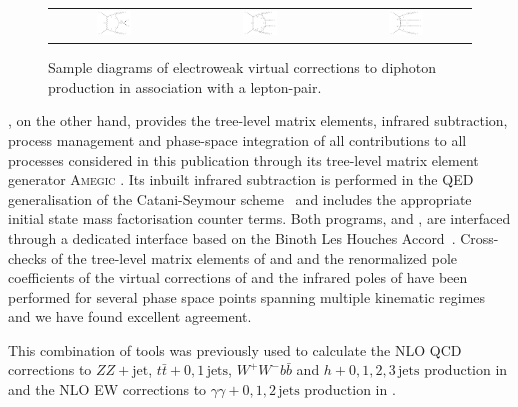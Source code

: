 \begin{figure}[t!]
  \begin{tabular}{ccccc}
    \includegraphics[width=0.288\textwidth]{diagrams/aaZ_V_2} & &
    \includegraphics[width=0.288\textwidth]{diagrams/aaZ_V_1} & &
    \includegraphics[width=0.288\textwidth]{diagrams/aaZ_V_3} \\
  \end{tabular}
  \caption{
    Sample diagrams of electroweak virtual corrections to diphoton 
    production in association with a lepton-pair.
    \label{fig:aaz:amps}
  }
\end{figure}

\Sherpa, on the other hand, provides the tree-level matrix 
elements, infrared subtraction, process management and phase-space 
integration of all contributions to all processes considered in 
this publication through its tree-level matrix element generator 
\textsc{Amegic} \cite{Krauss:2001iv}. 
Its inbuilt infrared subtraction is performed in the QED 
generalisation of the Catani-Seymour scheme~\cite{Catani:1996vz,
  Dittmaier:1999mb,Gleisberg:2007md,Kallweit:2014xda,
  Kallweit:2015dum,Kallweit:2017khh,Schonherr:2017xxx}
and includes the appropriate initial state mass factorisation 
counter terms.
Both programs, \Sherpa and \GoSam, are interfaced through a 
dedicated interface based on the 
Binoth Les Houches Accord~\cite{Binoth:2010xt,Alioli:2013nda}. 
Cross-checks of the tree-level matrix elements of \GoSam and 
\Sherpa and the renormalized pole coefficients of the virtual 
corrections of \GoSam and the infrared poles of \Sherpa have 
been performed for several phase space points spanning 
multiple kinematic regimes and we have found excellent 
agreement.

This combination of tools was previously used to calculate the 
NLO QCD corrections to $ZZ+\text{jet}$, $t\bar{t}+0,1\,\text{jets}$, 
$W^{+}W^{-}b\bar{b}$ and $h+0,1,2,3\,\text{jets}$ production 
in \cite{Binoth:2009wk,Hoeche:2013mua,Heinrich:2013qaa,
  Greiner:2015jha,Greiner:2016awe,Heinrich:2017bqp} and the 
NLO EW corrections to $\gamma\gamma+0,1,2\,\text{jets}$ production 
in \cite{Chiesa:2017gqx}.
